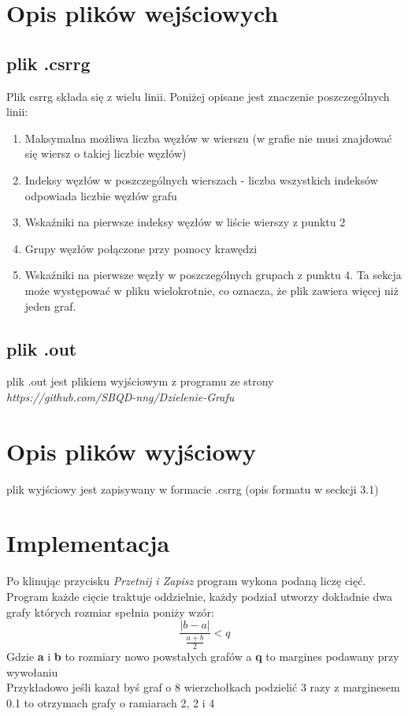 \documentclass{article}
\begin{document}
\section{Opis plików wejściowych}

\subsection{plik .csrrg}
Plik csrrg składa się z wielu linii. Poniżej opisane jest znaczenie poszczególnych linii:
\begin{enumerate}
    \item Maksymalna możliwa liczba węzłów w wierszu (w grafie nie musi znajdować się wiersz o takiej liczbie węzłów)
    \item Indeksy węzłów w poszczególnych wierszach - liczba wszystkich indeksów odpowiada liczbie węzłów grafu
    \item Wskaźniki na pierwsze indeksy węzłów w liście wierszy z punktu 2
    \item Grupy węzłów połączone przy pomocy krawędzi
    \item Wskaźniki na pierwsze węzły w poszczególnych grupach z punktu 4. Ta sekcja może występować w pliku wielokrotnie, co oznacza, że plik zawiera więcej niż jeden graf.
\end{enumerate}
\subsection{plik .out}
    plik .out jest plikiem wyjściowym z programu ze strony \textit{https://github.com/SBQD-nng/Dzielenie-Grafu}

\section{Opis plików wyjściowy}
plik wyjściowy jest zapisywany w formacie .csrrg (opis formatu w seckcji 3.1)


\section{Implementacja}
Po klinując przycisku \textit{Przetnij i Zapisz} program wykona podaną liczę cięć. \\
Program każde cięcie traktuje oddzielnie, każdy podział utworzy dokładnie dwa grafy których rozmiar spełnia poniży wzór:
\[\frac{|b-a|}{\frac{a+b}{2}}<q\] Gdzie \textbf{a} i \textbf{b} to rozmiary nowo powstałych grafów a \textbf{q} to margines podawany przy wywołaniu \\
Przykładowo jeśli kazał byś graf o 8 wierzchołkach podzielić 3 razy z marginesem 0.1 to otrzymach grafy o ramiarach 2, 2 i 4
\end{document}
